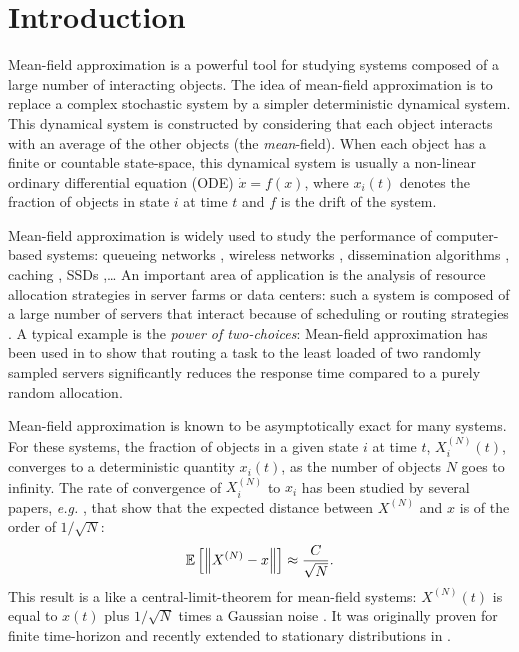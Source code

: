 \documentclass[sigconf]{acmart}
\newcommand\XN{X^{(N)}}
\newcommand\esp[1]{{\mathchoice{\besp{#1}}{\sesp{#1}}{\sesp{#1}}{\sesp{#1}}}}
\newcommand\besp[1]{\mathbb{E}\left[#1\right]}
\newcommand\sesp[1]{\mathbb{E}[#1]}
\newcommand\norm[1]{{\mathchoice{\bnorm{#1}}{\snorm{#1}}{\snorm{#1}}{\snorm{#1}}}}
\newcommand\bnorm[1]{\left\|#1\right\|}
\newcommand\snorm[1]{\|#1\|}
\begin{document}


\maketitle

\section{Introduction}

Mean-field approximation is a powerful tool for studying systems
composed of a large number of interacting objects. The idea of
mean-field approximation is to replace a complex stochastic system by
a simpler deterministic dynamical system.  This dynamical system is
constructed by considering that each object interacts with an average
of the other objects (the \emph{mean}-field). When each object has a
finite or countable state-space, this dynamical system is usually a
non-linear ordinary differential equation (ODE) $\dot{x}=f(x)$, where
$x_i(t)$ denotes the fraction of objects in state $i$ at time $t$ and
$f$ is the drift of the system.

Mean-field approximation is widely used to study the performance of
computer-based systems: queueing networks \cite{baccelli1992mean},
wireless networks \cite{cecchi2015mean}, dissemination algorithms
\cite{chaintreau2009age}, caching \cite{gast2015transient}, SSDs
\cite{van2013mean},\dots{} An important area of application is the
analysis of resource allocation strategies in server farms or data
centers: such a system is composed of a large number of servers that
interact because of scheduling or routing strategies
\cite{gast2010mean,lu2011join,mitzenmacher1996power,tsitsiklis2011power,vvedenskaya1996queueing,minnebo2014fair}.
A typical example is the \emph{power of two-choices}: Mean-field
approximation has been used in
\cite{mitzenmacher1996power,vvedenskaya1996queueing} to show that
routing a task to the least loaded of two randomly sampled servers
significantly reduces the response time compared to a purely random
allocation.

Mean-field approximation is known to be asymptotically exact for many
systems. For these systems, the fraction of objects in a given state
$i$ at time $t$, $\XN_i(t)$, converges to a deterministic quantity
$x_i(t)$, as the number of objects $N$ goes to infinity.  The rate of
convergence of $\XN_i$ to $x_i$ has been studied by several papers,
\emph{e.g.}  \cite{benaim2008class,kurtz70,ying2016rate}, that show
that the expected distance between $\XN$ and $x$ is of the order of
$1/\sqrt{N}$:
\begin{align}
  \label{eq:1/sqrt{N}}
  \esp{\norm{\XN-x}} \approx \frac{C}{\sqrt{N}}.
\end{align}
This result is a like a central-limit-theorem for mean-field systems:
$\XN(t)$ is equal to $x(t)$ plus $1/\sqrt{N}$ times a Gaussian noise
\cite{kurtz70}. It was originally proven for finite time-horizon and
recently extended to stationary distributions in \cite{ying2016rate}.
\end{document}
